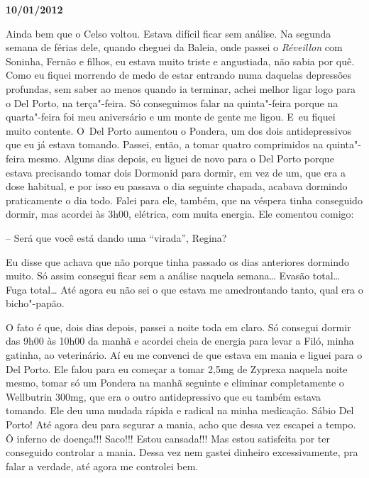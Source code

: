 \begin{center}\asterisc{}\end{center}

\begin{flushright}\textbf{10/01/2012}\end{flushright}


Ainda bem que o Celso voltou. Estava difícil ficar sem análise. Na
segunda semana de férias dele, quando cheguei da Baleia, onde passei o
\emph{Réveillon} com Soninha, Fernão e filhos, eu estava muito triste e
angustiada, não sabia por quê. Como eu fiquei morrendo de medo de estar
entrando numa daquelas depressões profundas, sem saber ao menos quando
ia terminar, achei melhor ligar logo para o Del Porto, na terça"-feira.
Só conseguimos falar na quinta"-feira porque na quarta"-feira foi meu
aniversário e um monte de gente me ligou. E~eu fiquei muito contente. O~Del Porto aumentou o Pondera, um dos dois antidepressivos que eu já
estava tomando. Passei, então, a tomar quatro comprimidos na
quinta"-feira mesmo. Alguns dias depois, eu liguei de novo para o Del
Porto porque estava precisando tomar dois Dormonid para dormir, em vez
de um, que era a dose habitual, e por isso eu passava o dia seguinte
chapada, acabava dormindo praticamente o dia todo. Falei para ele,
também, que na véspera tinha conseguido dormir, mas acordei às 3h00,
elétrica, com muita energia. Ele comentou comigo:

-- Será que você está dando uma ``virada'', Regina?

Eu disse que achava que não porque tinha passado os dias anteriores
dormindo muito. Só assim consegui ficar sem a análise naquela
semana… Evasão total… Fuga total… Até agora eu não
sei o que estava me amedrontando tanto, qual era o bicho"-papão.

O fato é que, dois dias depois, passei a noite toda em claro. Só
consegui dormir das 9h00 às 10h00 da manhã e acordei cheia de energia
para levar a Filó, minha gatinha, ao veterinário. Aí eu me convenci de
que estava em mania e liguei para o Del Porto. Ele falou para eu começar
a tomar 2,5mg de Zyprexa naquela noite mesmo, tomar só um Pondera na
manhã seguinte e eliminar completamente o Wellbutrin 300mg, que era o
outro antidepressivo que eu também estava tomando. Ele deu uma mudada
rápida e radical na minha medicação. Sábio Del Porto! Até agora deu para
segurar a mania, acho que dessa vez escapei a tempo. Ô inferno de
doença!!! Saco!!! Estou cansada!!! Mas estou satisfeita por ter
conseguido controlar a mania. Dessa vez nem gastei dinheiro
excessivamente, pra falar a verdade, até agora me controlei bem.

